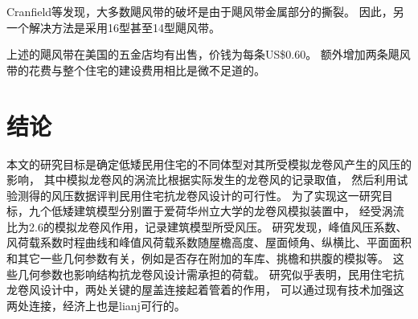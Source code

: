 \documentclass{ctexart}
\begin{document}
Cranfield等\cite{canfield1991uplift}发现，大多数飓风带的破坏是由于飓风带金属部分的撕裂。
因此，另一个解决方法是采用16型甚至14型飓风带。

上述的飓风带在美国的五金店均有出售，价钱为每条US\$0.60。
额外增加两条飓风带的花费与整个住宅的建设费用相比是微不足道的。 	


\section{结论}
本文的研究目标是确定低矮民用住宅的不同体型对其所受模拟龙卷风产生的风压的影响，
其中模拟龙卷风的涡流比根据实际发生的龙卷风的记录取值，
然后利用试验测得的风压数据评判民用住宅抗龙卷风设计的可行性。
为了实现这一研究目标，九个低矮建筑模型分别置于爱荷华州立大学的龙卷风模拟装置中，
经受涡流比为\num{2.6}的模拟龙卷风作用，记录建筑模型所受风压。
研究发现，峰值风压系数、风荷载系数时程曲线和峰值风荷载系数随屋檐高度、屋面倾角、纵横比、平面面积
和其它一些几何参数有关，例如是否存在附加的车库、挑檐和拱腹的模拟等。
这些几何参数也影响结构抗龙卷风设计需承担的荷载。
研究似乎表明，民用住宅抗龙卷风设计中，两处关键的屋盖连接起着管着的作用，
可以通过现有技术加强这两处连接，经济上也是lianj可行的。

\printbibliography
\end{document}
